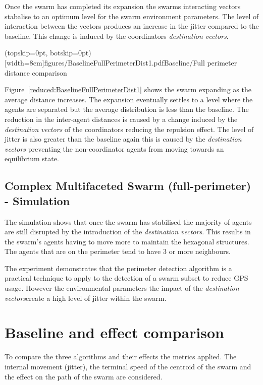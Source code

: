 \documentclass{ieeeaccess}
\begin{document}
Once the swarm has completed its expansion the swarms interacting vectors stabalise to an optimum level for the swarm environment parameters. The level of interaction between the vectors produces an increase in the jitter compared to the baseline. This change is induced by the coordinators \textit{destination vectors}.


\Figure[t!](topskip=0pt, botskip=0pt)[width=8cm]{figures/BaselineFullPerimeterDist1.pdf}{Baseline/Full perimeter distance comparison\label{reduced:BaselineFullPerimeterDist1}}

Figure~\ref{reduced:BaselineFullPerimeterDist1} shows the swarm expanding as the average distance increases. The expansion eventually settles to a level where the agents are separated but the average distribution is less than the baseline. The reduction in the inter-agent distances is caused by a change induced by the \textit{destination vectors} of the coordinators reducing the repulsion effect. The level of jitter is also greater than the baseline again this is caused by the \textit{destination vectors} preventing the non-coordinator agents from moving towards an equilibrium state.

\subsection{Complex Multifaceted Swarm (full-perimeter) - Simulation}
The simulation shows that once the swarm has stabilised the majority of agents are still disrupted by the introduction of the \textit{destination vectors}. This results in the swarm's agents having to move more to maintain the hexagonal structures. The agents that are on the perimeter tend to have 3 or more neighbours. 

The experiment demonstrates that the perimeter detection algorithm is a practical technique to apply to the detection of a swarm subset to reduce GPS usage. However the environmental parameters the impact of the \textit{destination vectors}create a high level of jitter within the swarm.

\section{Baseline and effect comparison\label{section:compareBaselineAll1}}
To compare the three algorithms and their effects the metrics applied. The internal movement (jitter), the terminal speed of the centroid of the swarm and the effect on the path of the swarm are considered. 
\end{document}
